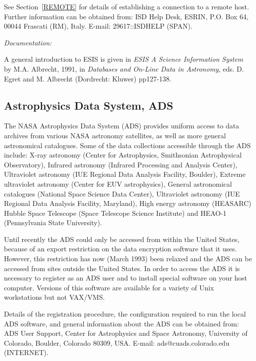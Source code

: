 \documentclass[twoside,11pt]{article}
\newcommand{\xlabel}[1]{}
\begin{document}
See Section~\ref{REMOTE} for details of establishing a connection to
a remote host. Further information can be obtained from: ISD Help Desk,
ESRIN, P.O. Box 64, 00044 Frascati (RM), Italy. E-mail: 29617::ISDHELP
(SPAN).

{\it Documentation:}

A general introduction to ESIS is given in {\it ESIS A Science 
Information System} by M.A. Albrecht, 1991, in {\it Databases and 
On-Line Data in Astronomy}, eds. D. Egret and M. Albrecht (Dordrecht: 
Kluwer) pp127-138.

\subsection{Astrophysics Data System, ADS
\xlabel{astrophysics_data_system_ads}}

The NASA Astrophysics Data System (ADS) provides uniform access to data
archives from various NASA astronomy satellites, as well as more general
astronomical catalogues. Some of the data collections accessible through 
the ADS include: X-ray astronomy (Center for Astrophysics, Smithsonian 
Astrophysical Observatory), Infrared astronomy (Infrared Processing and
Analysis Center), Ultraviolet astronomy (IUE Regional Data Analysis 
Facility, Boulder), Extreme ultraviolet astronomy (Center for EUV 
astrophysics), General astronomical catalogues (National Space Science
Data Center), Ultraviolet astronomy (IUE Regional Data Analysis 
Facility, Maryland), High energy astronomy (HEASARC) Hubble Space
Telescope (Space Telescope Science Institute) and HEAO-1 (Pennsylvania
State University).

Until recently the ADS could only be accessed from within the United 
States, because of an export restriction on the data encryption software
that it uses. However, this restriction has now (March 1993) been 
relaxed and the ADS can be accessed from sites outside the United 
States. In order to access the ADS it is necessary to register as an ADS
user and to install special software on your host computer. Versions of 
this software are available for a variety of Unix workstations but not 
VAX/VMS.

Details of the registration procedure, the configuration required to
run the local ADS software, and general information about the ADS can be
obtained from: ADS User Support, Center for Astrophysics and Space 
Astronomy, University of Colorado, Boulder, Colorado 80309, USA. E-mail:
ads@cuads.colorado.edu (INTERNET).
\end{document}
